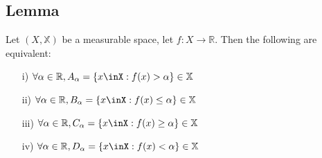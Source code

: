 \documentclass[a4paper, 12pt, twoside]{article}
\begin{document}
        \subsection{Lemma}
            Let $(X,\mathbb{X})$ be a measurable space, let $f:X \to  \mathbb{R}$. Then the following are equivalent:
            \begin{itemize}
                \item[i)] $\forall\alpha\in \mathbb{R}, A_{\alpha}=\{x\inX:f(x)>\alpha\}\in \mathbb{X}$
                \item[ii)] $\forall\alpha\in \mathbb{R}, B_{\alpha}=\{x\inX:f(x)\leq\alpha\}\in \mathbb{X}$
                \item[iii)] $\forall\alpha\in \mathbb{R}, C_{\alpha}=\{x\inX:f(x)\geq\alpha\}\in \mathbb{X}$
                \item[iv)] $\forall\alpha\in \mathbb{R}, D_{\alpha}=\{x\inX:f(x)<\alpha\}\in \mathbb{X}$
            \end{itemize}
\end{document}
